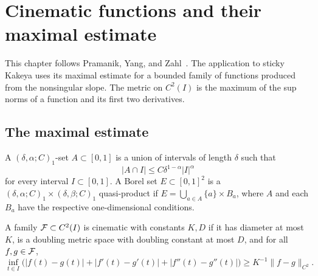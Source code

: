 \chapter{Cinematic functions and their maximal estimate}
\label{chap:cinematic}

This chapter follows Pramanik, Yang, and Zahl~\cite{PYZ}. The
application to sticky Kakeya uses its maximal estimate for a
bounded family of functions produced from the nonsingular slope.
The metric on $C^2(I)$ is the maximum of the sup norms of a
function and its first two derivatives.

\section{The maximal estimate}

\begin{definition}
\label{def:quasi-product}
\leanok
A $(\delta,\alpha;C)_1$-set $A\subset[0,1]$ is a union of
intervals of length $\delta$ such that
\[
                         |A\cap I|\leq C\delta^{1-\alpha}|I|^\alpha
\]
for every interval $I\subset[0,1]$. A Borel set $E\subset[0,1]^2$
is a $(\delta,\alpha;C)_1\times(\delta,\beta;C)_1$ quasi-product
if $E=\bigcup_{a\in A}\{a\}\times B_a$, where $A$ and each
$B_a$ have the respective one-dimensional conditions.
\end{definition}

\begin{definition}
\label{def:cinematic-family}
\leanok
A family $\mathcal{F}\subset C^2(I)$ is cinematic with constants $K,D$
if it has diameter at most $K$, is a doubling metric space with
doubling constant at most $D$, and for all $f,g\in\mathcal{F}$,
\[
 \inf_{t\in I}\bigl(|f(t)-g(t)|+|f'(t)-g'(t)|+|f''(t)-g''(t)|\bigr)
                                      \geq K^{-1}\|f-g\|_{C^2}.
\]
\end{definition}


